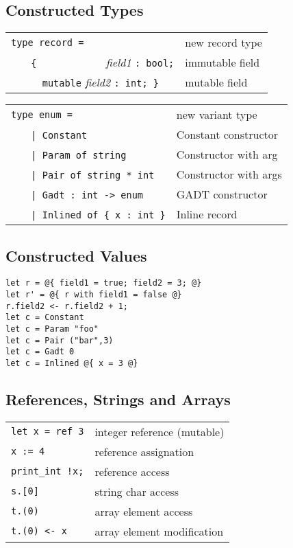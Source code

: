 \documentclass[10pt,landscape]{article}
\begin{document}
\begin{multicols}{3}
\subsection{Constructed Types}

\begin{tabular}{ll}
\verb!type record =! & new record type \\
~~~ \verb!{!~~~~~~~~~~~~ \emph{field1} \verb!: bool;! & immutable field \\
~~~ \verb!  mutable! \emph{field2} \verb!: int; }! & mutable field \\
\end{tabular}
\begin{tabular}{ll}
\verb!type enum =! & new variant type \\
~~~ \verb!| Constant! & Constant constructor \\
~~~ \verb!| Param of string! & Constructor with arg \\
~~~ \verb!| Pair of string * int! & Constructor with args \\
~~~ \verb!| Gadt : int -> enum! & GADT constructor \\
~~~ \verb!| Inlined of { x : int }! & Inline record \\
\end{tabular}

\subsection{Constructed Values}

\begin{Verbatim}
let r = @{ field1 = true; field2 = 3; @}
let r' = @{ r with field1 = false @}
r.field2 <- r.field2 + 1;
let c = Constant
let c = Param "foo"
let c = Pair ("bar",3)
let c = Gadt 0
let c = Inlined @{ x = 3 @}
\end{Verbatim}

\subsection{References, Strings and Arrays}

\begin{tabular}{ll}
\verb!let x = ref 3! & integer reference (mutable) \\
\verb!x := 4! & reference assignation \\
\verb&print_int !x;& & reference access \\
\verb!s.[0]! & string char access \\
\verb!t.(0)! & array element access \\
\verb!t.(0) <- x! & array element modification \\
\end{tabular}


\end{multicols}
\end{document}
